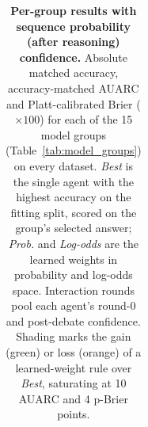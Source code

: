 \begin{table}[p]
{\begin{tabular}{cc|c|ccc|ccc|c|ccc|ccc|c|ccc|ccc}
\end{tabular}}
\caption{\textbf{Per-group results with sequence probability (after reasoning) confidence.} Absolute matched accuracy, accuracy-matched AUARC and Platt-calibrated Brier ($\times 100$) for each of the 15 model groups (Table~\ref{tab:model_groups}) on every dataset. \emph{Best} is the single agent with the highest accuracy on the fitting split, scored on the group's selected answer; \emph{Prob.} and \emph{Log-odds} are the learned weights in probability and log-odds space. Interaction rounds pool each agent's round-0 and post-debate confidence. Shading marks the gain (green) or loss (orange) of a learned-weight rule over \emph{Best}, saturating at 10 AUARC and 4 p-Brier points.}
\label{tab:per_group_seq_reasoned}
\end{table}
